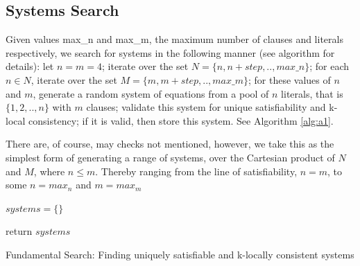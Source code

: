 \subsection[Systems Search]{Systems Search}
Given values max\_n	and max\_m, the maximum number of clauses and literals respectively, we search for systems in the following manner (see algorithm for details): let $n=m=4$; iterate over the set $N=\{n, n+step,..,max\_n\}$; for each $n \in N$, iterate over the set $M=\{m, m+step,..,max\_m\}$; for these values of $n$ and $m$, generate a random system of equations from a pool of $n$ literals, that is $\{1,2,..,n\}$ with $m$ clauses; validate this system for unique satisfiability and k-local consistency; if it is valid, then store this system. See Algorithm \ref{alg:a1}.
\par
There are, of course, may checks not mentioned, however, we take this as the simplest form of generating a range of systems, over the Cartesian product of $N$ and $M$, where $n \leq m$. Thereby ranging from the line of satisfiability, $n=m$, to some $n=max_n$ and $m=max_m$

\begin{algorithm}[htbp!]
\SetAlgoNoLine
{}
$systems = \{\}$\;


return $systems$
\caption{Fundamental Search: Finding uniquely satisfiable and k-locally consistent systems}
\label{alg:a1}
\end{algorithm}

\newpage
